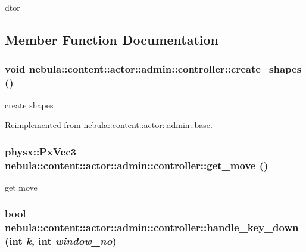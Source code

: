 dtor 

\subsection{Member Function Documentation}
\hypertarget{classnebula_1_1content_1_1actor_1_1admin_1_1controller_a8f4df19230f21a264d3325a5fcd5c1fa}{
\subsubsection[{create\_\-shapes}]{\setlength{\rightskip}{0pt plus 5cm}void nebula::content::actor::admin::controller::create\_\-shapes ()}}
\label{classnebula_1_1content_1_1actor_1_1admin_1_1controller_a8f4df19230f21a264d3325a5fcd5c1fa}


create shapes 

Reimplemented from \hyperlink{classnebula_1_1content_1_1actor_1_1admin_1_1base_a0b3740d9da779fe2817e0d64ac733cdf}{nebula::content::actor::admin::base}.\hypertarget{classnebula_1_1content_1_1actor_1_1admin_1_1controller_a6caff8dfe06a73d8c60189c49fe0ff5c}{
\subsubsection[{get\_\-move}]{\setlength{\rightskip}{0pt plus 5cm}physx::PxVec3 nebula::content::actor::admin::controller::get\_\-move ()}}
\label{classnebula_1_1content_1_1actor_1_1admin_1_1controller_a6caff8dfe06a73d8c60189c49fe0ff5c}


get move \hypertarget{classnebula_1_1content_1_1actor_1_1admin_1_1controller_a21df7a08d4bc5087833ba0a31be01137}{
\subsubsection[{handle\_\-key\_\-down}]{\setlength{\rightskip}{0pt plus 5cm}bool nebula::content::actor::admin::controller::handle\_\-key\_\-down (int {\em k}, \/  int {\em window\_\-no})}}
\label{classnebula_1_1content_1_1actor_1_1admin_1_1controller_a21df7a08d4bc5087833ba0a31be01137}


